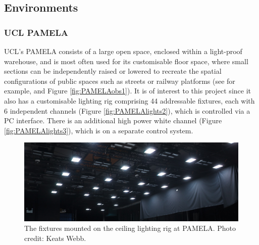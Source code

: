 \subsection{Environments}

\subsubsection{\gls{UCL} \acrshort{PAMELA}} \label{sec:PAMELA}

\gls{UCL}'s \acrfull{PAMELA} consists of a large open space, enclosed within a light-proof warehouse, and is most often used for its customisable floor space, where small sections can be independently raised or lowered to recreate the spatial configurations of public spaces such as streets or railway platforms (see \citet{cheng_effect_2018} for example, and Figure \ref{fig:PAMELAobs1}). It is of interest to this project since it also has a customisable lighting rig comprising 44 addressable fixtures, each with 6 independent channels (Figure \ref{fig:PAMELAlights2}), which is controlled via a PC interface. There is an additional high power white channel (Figure \ref{fig:PAMELAlights3}), which is on a separate control system. 

\begin{figure}[hbtp]
\includegraphics[max width=\textwidth]{figs/tablet/PAMELAlights1.jpg}
\caption{The fixtures mounted on the ceiling lighting rig at \acrshort{PAMELA}. Photo credit: Keats Webb.}
\label{fig:PAMELAlights1}
\end{figure}

